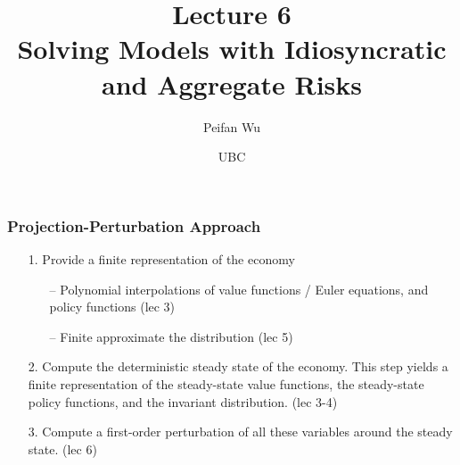 \documentclass[aspectratio=169, 11pt]{beamer}
\begin{document}
\title{Lecture 6 \\ Solving Models with Idiosyncratic and Aggregate Risks}
\author[Wu]{Peifan Wu}
\date{UBC}

\begin{frame}
\titlepage
\end{frame}

\begin{frame}
\frametitle{Projection-Perturbation Approach}
  \begin{itemize}
    \item[1.] Provide a finite representation of the economy
    \begin{itemize}
      \medskip
      \item[--] Polynomial interpolations of value functions / Euler equations, and policy functions (lec 3)
      \medskip
      \item[--] Finite approximate the distribution (lec 5)
    \end{itemize}
    \bigskip
    \item[2.] Compute the deterministic steady state of the economy. This step yields a finite representation of the steady-state value functions, the steady-state policy functions, and the invariant distribution. (lec 3-4)
    \bigskip
    \item[3.] Compute a first-order perturbation of all these variables around the steady state. (lec 6)
  \end{itemize}
\end{frame}
\end{document}
